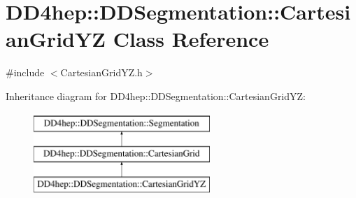 \hypertarget{class_d_d4hep_1_1_d_d_segmentation_1_1_cartesian_grid_y_z}{}\section{D\+D4hep\+:\+:D\+D\+Segmentation\+:\+:Cartesian\+Grid\+YZ Class Reference}
\label{class_d_d4hep_1_1_d_d_segmentation_1_1_cartesian_grid_y_z}


{\ttfamily \#include $<$Cartesian\+Grid\+Y\+Z.\+h$>$}

Inheritance diagram for D\+D4hep\+:\+:D\+D\+Segmentation\+:\+:Cartesian\+Grid\+YZ\+:\begin{figure}[H]
\begin{center}
\leavevmode
\includegraphics[height=3.000000cm]{class_d_d4hep_1_1_d_d_segmentation_1_1_cartesian_grid_y_z}
\end{center}
\end{figure}
